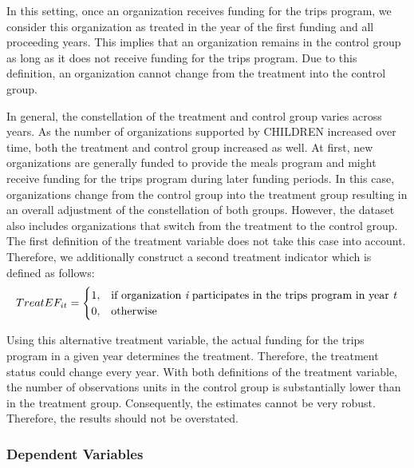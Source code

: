 \documentclass[12pt, a4paper, titlepage]{article}\usepackage[]{graphicx}\usepackage[]{color}
\begin{document}
In this setting, once an organization receives funding for the trips program, we consider this organization as treated in the year of the first funding and all proceeding years. This implies that an organization remains in the control group as long as it does not receive funding for the trips program. Due to this definition, an organization cannot change from the treatment into the control group.

In general, the constellation of the treatment and control group varies across years. As the number of organizations supported by CHILDREN increased over time, both the treatment and control group increased as well. At first, new organizations are generally funded to provide the meals program and might receive funding for the trips program during later funding periods. In this case, organizations change from the control group into the treatment group resulting in an overall adjustment of the constellation of both groups. However, the dataset also includes organizations that switch from the treatment to the control group. The first definition of the treatment variable does not take this case into account. Therefore, we additionally construct a second treatment indicator which is defined as follows:
\begin{equation}
TreatEF_{it} =
\begin{cases}
1, & \text{if organization \begin{itshape}{i}\end{itshape} participates in the trips program in year \begin{itshape}{t}\end{itshape}}\\
0, & \text{otherwise}
\end{cases}
\end{equation}

Using this alternative treatment variable, the actual funding for the trips program in a given year determines the treatment. Therefore, the treatment status could change every year.
With both definitions of the treatment variable, the number of observations units in the control group is substantially lower than in the treatment group. Consequently, the estimates cannot be very robust. Therefore, the results should not be overstated.

\subsubsection{Dependent Variables}
\end{document}
